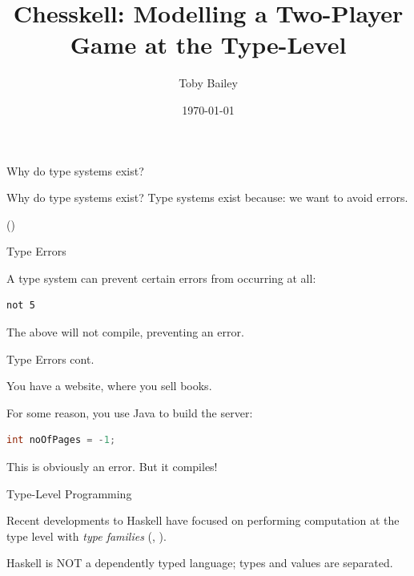 \documentclass{beamer}
\title{Chesskell: Modelling a Two-Player Game at the Type-Level}
\author{Toby Bailey}
\institute{Department of Computer Science}
\date{\today}
\begin{document}
\frame{\titlepage}

\begin{frame}[standout]

Why do type systems exist?
    
\end{frame}

\begin{frame}{Why do type systems exist?}
Type systems exist because: \pause we want to avoid errors.

(\cite{cardellitypes})


\end{frame}

\begin{frame}[fragile]{Type Errors}

A type system can prevent certain errors from occurring at all:

\begin{lstlisting}
not 5
\end{lstlisting}

The above will not compile, preventing an error.
    
\end{frame}

\begin{frame}[fragile]{Type Errors cont.}

You have a website, where you sell books.

\pause

For some reason, you use Java to build the server:

\begin{lstlisting}[language=Java]
int noOfPages = -1;
\end{lstlisting}

This is obviously an error. But it compiles!
    
\end{frame}

\begin{frame}[fragile]{Type-Level Programming}

Recent developments to Haskell have focused on performing computation at the type level with \emph{type families} (\cite{opentfs}, \cite{closedtfs}).

Haskell is NOT a dependently typed language; types and values are separated.
    
\end{frame}
\end{document}
